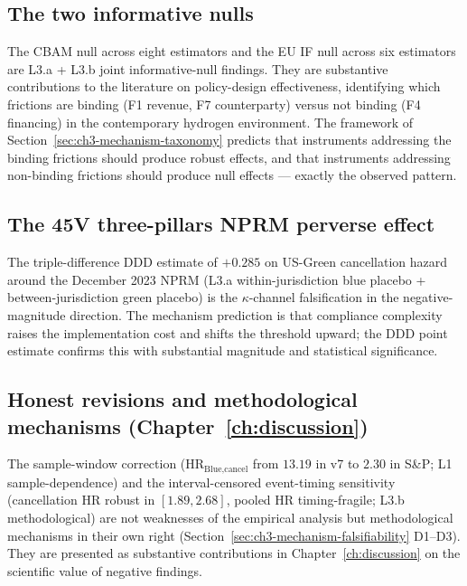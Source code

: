 \subsection{The two informative nulls}
\label{sec:ch3-conn-nulls}

The CBAM null across eight estimators and the EU IF null across six estimators are L3.a + L3.b joint informative-null findings. They are substantive contributions to the literature on policy-design effectiveness, identifying which frictions are binding (F1 revenue, F7 counterparty) versus not binding (F4 financing) in the contemporary hydrogen environment. The framework of Section~\ref{sec:ch3-mechanism-taxonomy} predicts that instruments addressing the binding frictions should produce robust effects, and that instruments addressing non-binding frictions should produce null effects --- exactly the observed pattern.

\subsection{The 45V three-pillars NPRM perverse effect}
\label{sec:ch3-conn-nprm}

The triple-difference DDD estimate of $+0.285$ on US-Green cancellation hazard around the December 2023 NPRM (L3.a within-jurisdiction blue placebo + between-jurisdiction green placebo) is the $\kappa$-channel falsification in the negative-magnitude direction. The mechanism prediction is that compliance complexity raises the implementation cost and shifts the threshold upward; the DDD point estimate confirms this with substantial magnitude and statistical significance.

\subsection{Honest revisions and methodological mechanisms (Chapter~\ref{ch:discussion})}
\label{sec:ch3-conn-methodological}

The sample-window correction (HR$_\text{Blue,cancel}$ from $13.19$ in v7 to $2.30$ in S\&P; L1 sample-dependence) and the interval-censored event-timing sensitivity (cancellation HR robust in $[1.89, 2.68]$, pooled HR timing-fragile; L3.b methodological) are not weaknesses of the empirical analysis but methodological mechanisms in their own right (Section~\ref{sec:ch3-mechanism-falsifiability} D1--D3). They are presented as substantive contributions in Chapter~\ref{ch:discussion} on the scientific value of negative findings.

